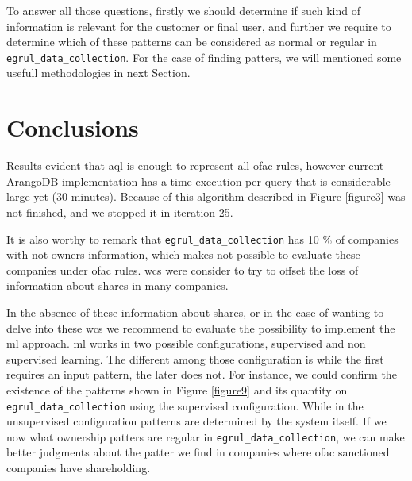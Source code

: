 \begin{spacing}{1.5}
To answer all those questions, firstly we should determine if such kind of information is relevant for the customer or final user, and further we require to determine which of these patterns can be considered as normal or regular in \texttt{egrul\_data\_collection}. For the case of finding patters, we will mentioned some usefull methodologies in next Section. 

\section{Conclusions}\label{con}

Results evident that \gls{aql} is enough to represent all \gls{ofac} rules, however current ArangoDB implementation has a time execution per query that is considerable large yet (30 minutes). Because of this algorithm described in Figure \ref{figure3} was not finished, and we stopped it in iteration 25. 

It is also worthy to remark that \texttt{egrul\_data\_collection} has 10 \% of companies with not owners information, which makes not possible to evaluate these companies under \gls{ofac} rules. \gls{wcs} were consider to try to offset the loss of information about shares in many companies. 

In the absence of these information about shares, or in the case of wanting to delve into these \gls{wcs} we recommend to evaluate the possibility to implement the \gls{ml} approach. \gls{ml} works in two possible configurations, supervised and non supervised learning. 
The different among those configuration is while the first requires an input pattern, the later does not. For instance, we could confirm the existence of the patterns shown in Figure \ref{figure9} and its quantity on \texttt{egrul\_data\_collection} using the supervised configuration. While in the unsupervised configuration patterns are determined by the system itself.   
If we now what ownership patters are regular in \texttt{egrul\_data\_collection}, we can make better judgments about the patter we find in companies where \gls{ofac} sanctioned companies have shareholding. 
\end{spacing}

 




